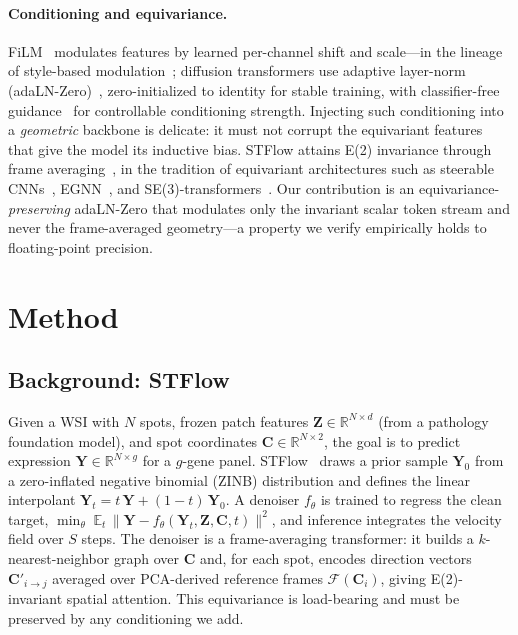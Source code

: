 \documentclass[10pt,twocolumn,letterpaper]{article}
\begin{document}
\paragraph{Conditioning and equivariance.}
FiLM~\cite{film} modulates features by learned per-channel shift and scale---in the lineage of
style-based modulation~\cite{stylegan}; diffusion transformers
use adaptive layer-norm (adaLN-Zero)~\cite{dit}, zero-initialized to identity for stable training,
with classifier-free guidance~\cite{cfg} for controllable conditioning strength. Injecting such conditioning into a
\emph{geometric} backbone is delicate: it must not corrupt the equivariant features that give the
model its inductive bias. STFlow attains E(2) invariance through frame averaging~\cite{frameaveraging},
in the tradition of equivariant architectures such as steerable CNNs~\cite{e2cnn},
EGNN~\cite{egnn}, and SE(3)-transformers~\cite{se3transformer}. Our contribution is an
equivariance-\emph{preserving} adaLN-Zero that modulates only the invariant scalar token stream and
never the frame-averaged geometry---a property we verify empirically holds to floating-point
precision.

\section{Method}
\label{sec:method}

\subsection{Background: STFlow}
Given a WSI with $N$ spots, frozen patch features $\mathbf{Z}\in\mathbb{R}^{N\times d}$ (from a
pathology foundation model), and spot coordinates $\mathbf{C}\in\mathbb{R}^{N\times 2}$, the
goal is to predict expression $\mathbf{Y}\in\mathbb{R}^{N\times g}$ for a $g$-gene panel.
STFlow~\cite{stflow} draws a prior sample $\mathbf{Y}_0$ from a zero-inflated negative binomial
(ZINB) distribution and defines the linear interpolant
$\mathbf{Y}_t = t\,\mathbf{Y} + (1-t)\,\mathbf{Y}_0$. A denoiser $f_\theta$ is trained to
regress the clean target, $\min_\theta \; \mathbb{E}_t\,\big\lVert \mathbf{Y} -
f_\theta(\mathbf{Y}_t,\mathbf{Z},\mathbf{C},t)\big\rVert^2$, and inference integrates the
velocity field over $S$ steps. The denoiser is a frame-averaging transformer: it builds a
$k$-nearest-neighbor graph over $\mathbf{C}$ and, for each spot, encodes direction vectors
$\mathbf{C}'_{i\to j}$ averaged over PCA-derived reference frames $\mathcal{F}(\mathbf{C}_i)$,
giving E(2)-invariant spatial attention. This equivariance is load-bearing and must be
preserved by any conditioning we add.
\end{document}
